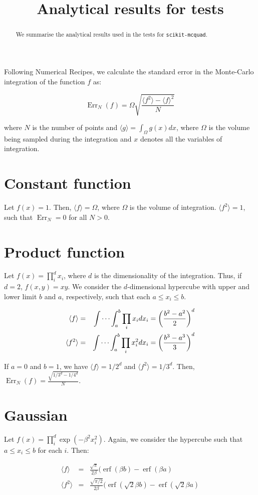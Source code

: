 \documentclass[a4paper]{article}
\title{Analytical results for tests}
\newcommand{\expval}[1]{\langle #1 \rangle}
\DeclareMathOperator{\Err}{Err}
\DeclareMathOperator{\erf}{erf}
\begin{document}
\maketitle

\begin{abstract}
We summarise the analytical results used in the tests for
\verb=scikit-mcquad=. 
\end{abstract}


Following Numerical Recipes, we calculate the standard error in the Monte-Carlo
integration of the function $f$ as:

\begin{equation}
    \Err_N(f) = \Omega \sqrt{\frac{\expval{f^2}-\expval{f}^2}{N}}
\end{equation}

where $N$ is the number of points and $\expval{g} = \int_\Omega g(x) dx$, where
$\Omega$ is the volume being sampled during the integration and $x$ denotes all
the variables of integration.


\section{Constant function}

Let $f(x) = 1$. Then, $\expval{f} = \Omega$, where $\Omega$ is the volume of
integration. $\expval{f^2} = 1$, such that $\Err_N = 0$ for all $N > 0$.


\section{Product function}

Let $f(x) = \prod_i^d x_i$, where $d$ is the dimensionality of the
integration. Thus, if $d = 2$, $f(x,y) = xy$. We consider the $d$-dimensional
hypercube with upper and lower limit $b$ and $a$, respectively, such that each
$a \le x_i \le b$. 

\begin{eqnarray}
    \expval{f} &=& \idotsint_a^b \prod_i x_i dx_i =
    \left(\frac{b^2-a^2}{2}\right)^d \\
    \expval{f^2} &=& \idotsint_a^b \prod_i x_i^2 dx_i =
    \left(\frac{b^3-a^3}{3}\right)^d 
\end{eqnarray}

If $a = 0$ and $b=1$, we have $\expval{f} = 1/2^d$ and $\expval{f^2} = 1/3^d$.
Then, $\Err_N(f) = \frac{\sqrt{1/3^d - 1/4^d}}{N}$.


\section{Gaussian}

Let $f(x) = \prod_i^d \exp(-\beta^2 x_i^2)$. Again, we consider the
hypercube such that $a \le x_i \le b$ for each $i$. Then:

\begin{eqnarray}
    \expval{f} &=& \frac{\sqrt{\pi}}{2\beta} (\erf(\beta b) - \erf(\beta a) \\
    \expval{f^2} &=& \frac{\sqrt{\pi/2}}{2\beta} (\erf(\sqrt{2}\beta b) -
    \erf(\sqrt{2}\beta a)
\end{eqnarray}
\end{document}
